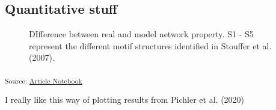 \documentclass[
  letterpaper,
  DIV=11,
  numbers=noendperiod]{scrartcl}
\begin{document}
\subsection{Quantitative stuff}\label{quantitative-stuff}

\begin{figure}[H]


\caption{\label{fig-topology}DIfference between real and model network
property. S1 - S5 represent the different motif structures identified in
Stouffer et al. (2007).}

\end{figure}%

\textsubscript{Source:
\href{https://BecksLab.github.io/ms_t_is_for_topology/index.qmd.html}{Article
Notebook}}

I really like this way of plotting results from Pichler et al. (2020)
\end{document}
